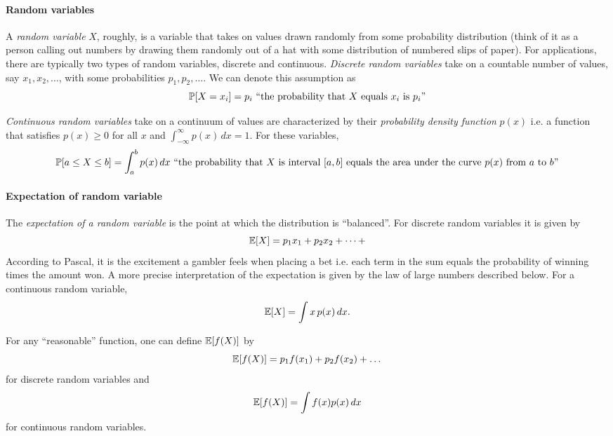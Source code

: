 \paragraph*{Random variables} A  \emph{random variable} $X$, roughly, is a variable that takes on values drawn randomly from some probability distribution (think of it as a person calling out numbers by drawing them randomly out of a hat with some distribution of numbered slips of paper).%
 For applications, there are typically two types of random variables, discrete and continuous.  \emph{Discrete random variables} take on a countable number of values, say $x_1,x_2,\dots$, with some probabilities $p_1,p_2,\dots$. We can denote this assumption as 
\[
\P[X=x_i]=p_i \mbox{ ``the probability that $X$ equals $x_i$ is $p_i$''}
\]

 \emph{Continuous random variables} take on a continuum of values are characterized by their  \emph{probability density function} $p(x)$ i.e. a function that satisfies $p(x)\ge 0$ for all $x$ and $\int_{-\infty}^\infty p(x)\,dx =1$. For these variables, 
\[
\P[a\le X\le b] = \int_a^b p(x)\,dx \mbox{ ``the probability that $X$ is interval $[a,b]$ equals the area under the curve $p(x)$ from $a$ to $b$''}
\]

\paragraph{Expectation of random variable} The  \emph{expectation of a random variable} is the point at which the distribution is ``balanced''. For discrete random variables it is given by 
\[
\E[X]=p_1x_1+p_2x_2+\dots + 
\]
According to Pascal, it is the excitement a gambler feels when placing a bet i.e. each term in the sum equals the probability of winning times the amount won. A more precise interpretation of the expectation is given by the law of large numbers described below. For a continuous random variable, 
\[
\E[X]=\int x\,p(x)\,dx.
\]

For any ``reasonable'' function, one can define $\E[f(X)]$ by %
\[
\E[f(X)]=p_1f(x_1)+p_2 f(x_2)+\dots
\]
for discrete random variables and 
\[
\E[f(X)]=\int f(x)p(x)\,dx
\]
for continuous random variables. 

